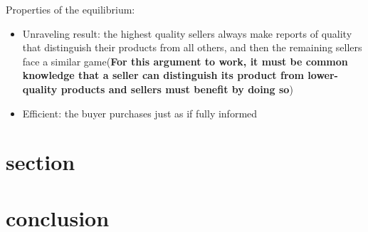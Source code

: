\documentclass[12pt,letterpaper]{article}
\begin{document}
Properties of the equilibrium: 
\begin{itemize}
	\item Unraveling result: the highest quality sellers always make reports of quality that distinguish their
	products from all others, and then the remaining sellers face a similar game(\textbf{For this argument to work, it must be common knowledge that a seller can distinguish its product from lower-quality products and sellers must benefit by doing so})
	\item  Efficient: the buyer purchases just as if fully informed
\end{itemize}
\section{section}

\section{conclusion}
         



\end{document}
